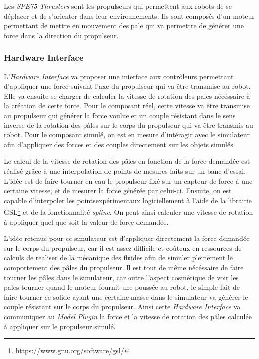 				Les \textit{SPE75 Thrusters} sont les propulseurs qui permettent aux robots de se déplacer et de s'orienter dans leur environnements. Ils sont composés d'un moteur permettant de mettre en mouvement des pale qui va permettre de générer une force dans la direction du propulseur.
				
			\subsubsection{Hardware Interface}

				L'\textit{Hardware Interface} va proposer une interface aux contrôleurs permettant d'appliquer une force suivant l'axe du propulseur qui va être transmise au robot. Elle va ensuite se charger de calculer la vitesse de rotation des pales nécéssaire à la création de cette force. Pour le composant réel, cette vitesse va être transmise au propulseur qui générer la force voulue et un couple résistant dans le sens inverse de la rotation des pâles sur le corps du propulseur qui va être transmis au robot. Pour le composant simulé, on est en mesure d'intéragir avec le simulateur afin d'appliquer des forces et des couples directement sur les objets simulés. 
				
				Le calcul de la vitesse de rotation des pâles en fonction de la force demandée est réalisé grâce à une interpolation de points de mesures faits sur un banc d'essai. L'idée est de faire tourner en eau le propulseur fixé sur un capteur de force à une certaine vitesse, et de mesurer la force générée par celui-ci. Ensuite, on est capable d'interpoler les pointsexpérimentaux logiciellement à l'aide de la librairie \gls{GSL}\footnote{\url{https://www.gnu.org/software/gsl/}} et de la fonctionnalité \textit{spline}. On peut ainsi calculer une vitesse de rotation à appliquer quel que soit la valeur de force demandée.
				
				L'idée retenue pour ce simulateur est d'appliquer directement la force demandée sur le corps du propulseur, car il est assez difficile et coûteux en ressources de calculs de realiser de la mécanique des fluides afin de simuler pleinement le comportement des pâles du propulseur. Il est tout de même nécéssaire de faire tourner les pâles dans le simulateur, car outre l'aspect cosmétique de voir les pales tourner quand le moteur fournit une poussée au robot, le simple fait de faire tourner ce solide ayant une certaine masse dans le simulateur va générer le couple résistant sur le corps du propulseur. Ainsi cette \textit{Hardware Interface} va communiquer au \textit{Model Plugin} la force et la vitesse de rotation des pâles calculée à appliquer sur le propulseur simulé.
	
